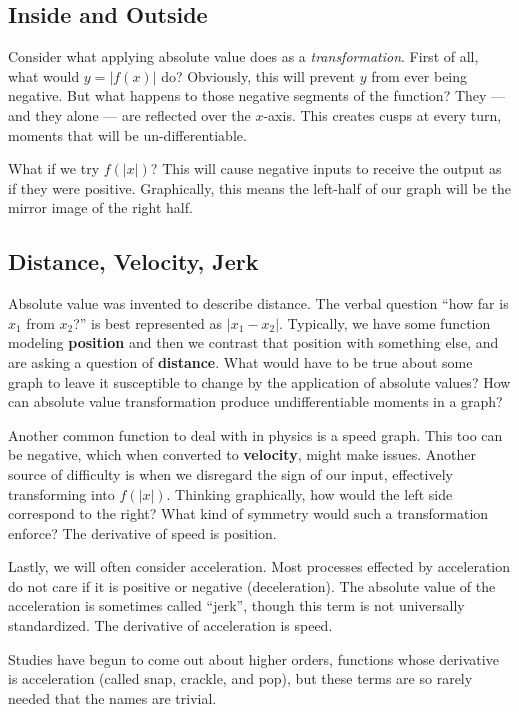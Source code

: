 
\subsection{Inside and Outside}



Consider what applying absolute value does as a \emph{transformation}.
First of all, what would $y=|f(x)|$ do?  Obviously, this will prevent $y$ from ever being negative.
But what happens to those negative segments of the function?  They --- and they alone ---
are reflected over the $x$-axis.  This creates cusps at every turn, moments that will
be un-differentiable.

What if we try $f(|x|)$?  This will cause negative inputs to receive the output as if they were
positive.  Graphically, this means the left-half of our graph will be the mirror image of the
right half.

\subsection{Distance, Velocity, Jerk}
Absolute value was invented to describe distance.  The verbal question ``how far is $x_1$ 
from $x_2$?'' is best represented as $|x_1-x_2|$.  Typically, we have some function modeling 
\textbf{position} and then we contrast that position with something else, and are asking a question of 
\textbf{distance}.  What would have to be true about some graph to leave it susceptible to change 
by the application of absolute values?  How can absolute value transformation produce
undifferentiable moments in a graph?

Another common function to deal with in physics is a speed graph.  This too can be negative,
which when converted to \textbf{velocity}, might make issues. Another source of difficulty
is when we disregard the sign of our input, effectively transforming into $f(|x|)$.  Thinking
graphically, how would the left side correspond to the right?  What kind of symmetry would
such a transformation enforce?  The derivative of speed is position.

Lastly, we will often consider acceleration.  Most processes effected by acceleration do not care if 
it is positive or negative (deceleration).  The absolute value of the acceleration is sometimes called 
``jerk'', though this term is not universally standardized.  The derivative of acceleration is speed.

Studies have begun to come out about higher orders, functions whose derivative is acceleration 
(called snap, crackle, and pop), but these terms are so rarely needed that the names are trivial.
  
